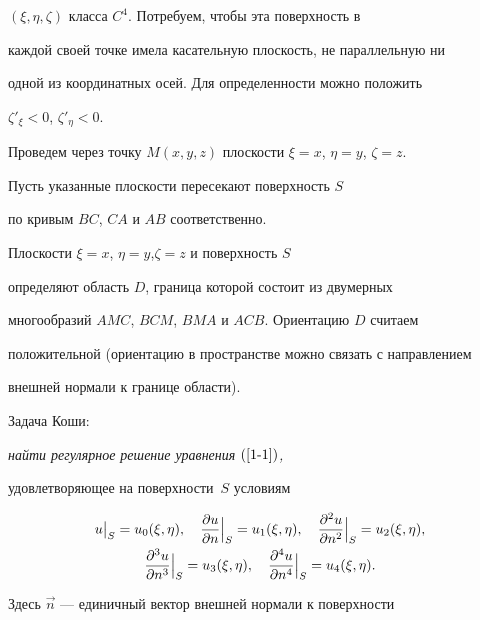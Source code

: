 $(\xi,\eta,\zeta)$ класса $C^4$. Потребуем, чтобы эта поверхность в


каждой своей точке имела касательную плоскость, не параллельную ни


одной из координатных осей. Для определенности можно положить


$\zeta'_{\xi}<0$, $\zeta'_{\eta}<0$.





Проведем через точку $M(x,y,z)$ плоскости $\xi=x$, $\eta=y$, $\zeta=z$.


Пусть указанные плоскости пересекают поверхность $S$


по кривым $BC$, $CA$ и $AB$ соответственно.


Плоскости $\xi=x$, $\eta=y$,\linebreak $\zeta=z$ и поверхность $S$


определяют область $D$, граница которой состоит из двумерных


многообразий $AMC$, $BCM$, $BMA$ и $ACB$. Ориентацию $D$ считаем


положительной (ориентацию в пространстве можно связать с направлением


внешней нормали к границе области).





Задача Коши: {\it найти регулярное решение уравнения $(\ref{1-1})$,


удовлетворяющее на поверхности~$S$ условиям}


\begin{gather}


u\big\vert_{S}=u_{0}(\xi,\eta),\quad


\frac{\partial u}{\partial n}\Big\vert_{S}=u_{1}(\xi,\eta),\quad


\frac{\partial^2 u}{\partial n^2}\Big\vert_{S}


=u_{2}(\xi,\eta),\notag \\


%


\label{1-4+}


\frac{\partial^3 u}{\partial n^3}\Big\vert_{S}


=u_{3}(\xi,\eta), \quad


\frac{\partial^4 u}{\partial n^4}\Big\vert_{S}=u_{4}(\xi,\eta).


\end{gather}


Здесь $\Vec n$ --- единичный вектор внешней нормали к поверхности


